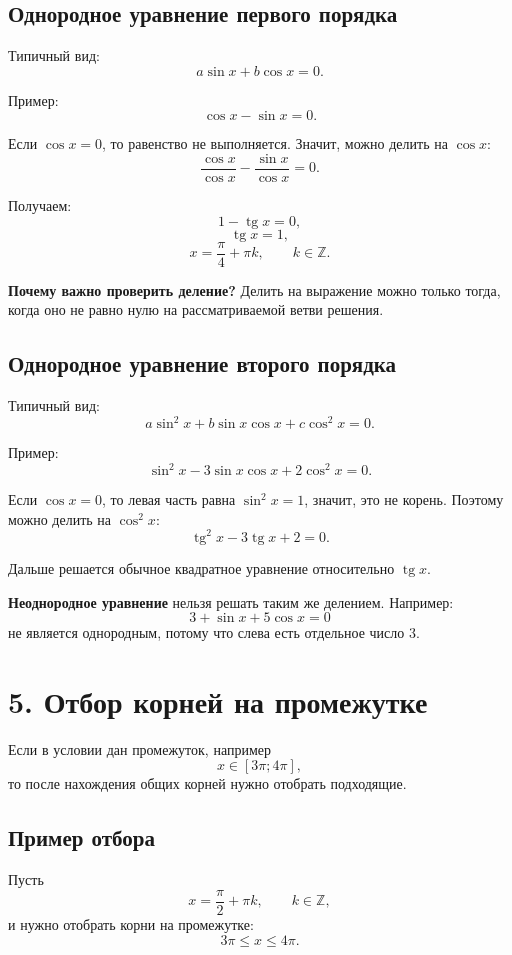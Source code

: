\documentclass[a4paper,12pt]{article}
\providecommand{\tg}{\mathop{\mathrm{tg}}\nolimits}
\newcommand{\important}[1]{\textcolor{darkaccent}{\textbf{#1}}}
\begin{document}
\subsection*{Однородное уравнение первого порядка}

Типичный вид:
\[
a\sin x+b\cos x=0.
\]

Пример:
\[
\cos x-\sin x=0.
\]

Если $\cos x=0$, то равенство не выполняется. Значит, можно делить на $\cos x$:
\[
\frac{\cos x}{\cos x}-\frac{\sin x}{\cos x}=0.
\]

Получаем:
\[
1-\tg x=0,
\]
\[
\tg x=1,
\]
\[
x=\frac{\pi}{4}+\pi k,\qquad k\in\mathbb Z.
\]

\important{Почему важно проверить деление?} Делить на выражение можно только тогда, когда оно не равно нулю на рассматриваемой ветви решения.

\subsection*{Однородное уравнение второго порядка}

Типичный вид:
\[
a\sin^2x+b\sin x\cos x+c\cos^2x=0.
\]

Пример:
\[
\sin^2x-3\sin x\cos x+2\cos^2x=0.
\]

Если $\cos x=0$, то левая часть равна $\sin^2x=1$, значит, это не корень. Поэтому можно делить на $\cos^2x$:
\[
\tg^2x-3\tg x+2=0.
\]

Дальше решается обычное квадратное уравнение относительно $\tg x$.

\important{Неоднородное уравнение} нельзя решать таким же делением. Например:
\[
3+\sin x+5\cos x=0
\]
не является однородным, потому что слева есть отдельное число $3$.

\section*{5. Отбор корней на промежутке}

Если в условии дан промежуток, например
\[
x\in[3\pi;4\pi],
\]
то после нахождения общих корней нужно отобрать подходящие.

\subsection*{Пример отбора}

Пусть
\[
x=\frac{\pi}{2}+\pi k,
\qquad k\in\mathbb Z,
\]
и нужно отобрать корни на промежутке:
\[
3\pi\le x\le 4\pi.
\]
\end{document}
